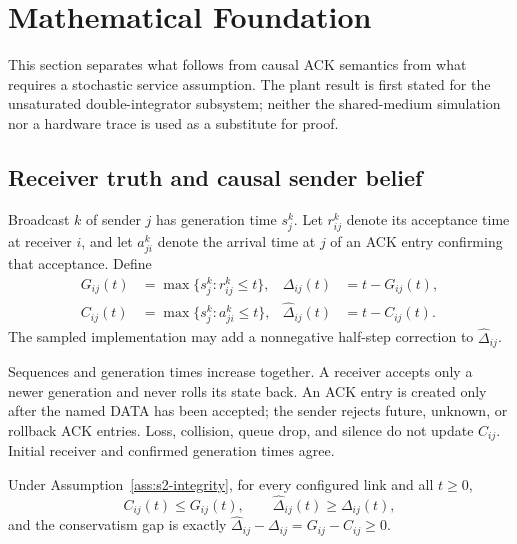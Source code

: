 \section{Mathematical Foundation}
\label{sec:s2-foundation}

This section separates what follows from causal ACK semantics from what
requires a stochastic service assumption.  The plant result is first stated
for the unsaturated double-integrator subsystem; neither the shared-medium
simulation nor a hardware trace is used as a substitute for proof.

\subsection{Receiver truth and causal sender belief}

Broadcast $k$ of sender $j$ has generation time $s_j^k$.  Let $r_{ij}^k$
denote its acceptance time at receiver $i$, and let $a_{ji}^k$ denote the
arrival time at $j$ of an ACK entry confirming that acceptance.  Define
\begin{align}
G_{ij}(t)&=\max\{s_j^k:r_{ij}^k\le t\}, &
\Delta_{ij}(t)&=t-G_{ij}(t),\label{eq:s2-true-age}\\
C_{ij}(t)&=\max\{s_j^k:a_{ji}^k\le t\}, &
\widehat\Delta_{ij}(t)&=t-C_{ij}(t).
\label{eq:s2-confirmed-age}
\end{align}
The sampled implementation may add a nonnegative half-step correction to
$\widehat\Delta_{ij}$.

\begin{assumption}
Sequences and generation times increase together.  A receiver accepts only a
newer generation and never rolls its state back.  An ACK entry is created only
after the named DATA has been accepted; the sender rejects future, unknown, or
rollback ACK entries.  Loss, collision, queue drop, and silence do not update
$C_{ij}$.  Initial receiver and confirmed generation times agree.
\label{ass:s2-integrity}
\end{assumption}

\begin{theorem}
Under Assumption~\ref{ass:s2-integrity}, for every configured link and all
$t\ge0$,
\begin{equation}
C_{ij}(t)\le G_{ij}(t),\qquad
\widehat\Delta_{ij}(t)\ge\Delta_{ij}(t),
\label{eq:s2-conservatism}
\end{equation}
and the conservatism gap is exactly
$\widehat\Delta_{ij}-\Delta_{ij}=G_{ij}-C_{ij}\ge0$.
\label{thm:s2-conservatism}
\end{theorem}

